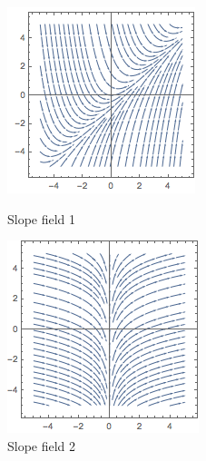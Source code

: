 \documentclass[11pt]{exam}
\begin{document}
\begin{questions}
\begin{figure}[h]
\centering
\begin{minipage}{.5\textwidth}
  \centering
  \includegraphics[width=.4\linewidth]{slopefield1}
  \caption{Slope field 1}
\end{minipage}%
\begin{minipage}{.5\textwidth}
  \centering
  \includegraphics[width=.4\linewidth]{slopefield2}
  \caption{Slope field 2}
\end{minipage}
\end{figure}


\end{questions}
\end{document}
